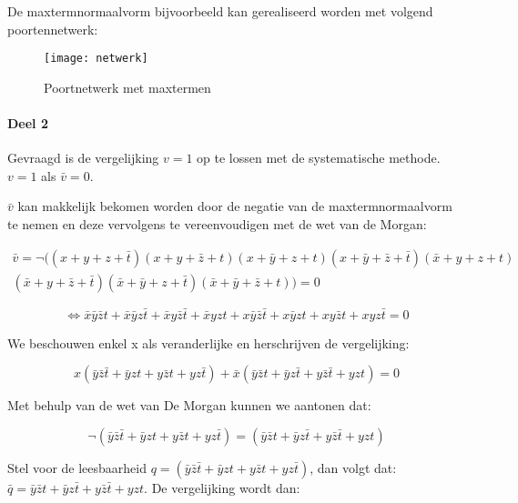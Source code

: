 \documentclass[12pt]{article}
\newcommand{\ov}[1]{\bar{#1}}
\begin{document}
De maxtermnormaalvorm bijvoorbeeld kan gerealiseerd worden met volgend poortennetwerk:


\begin{figure}[H]
\begin{center}
\texttt{[image: netwerk]}
\end{center}
\caption{Poortnetwerk met maxtermen}
\label{result11b}
\end{figure}

\paragraph{Deel 2}

Gevraagd is de vergelijking $v = 1$ op te lossen met de systematische methode. $v = 1$ als $\ov{v} = 0$.

$\ov{v}$ kan makkelijk bekomen worden door de negatie van de maxtermnormaalvorm te nemen en deze vervolgens te vereenvoudigen met de wet van de Morgan:

\begin{align}
\ov{v} = \neg ((x+y+z+\ov{t}) (x+y+\ov{z}+t) (x+\ov{y}+z+t) (x+\ov{y}+\ov{z}+\ov{t}) (\ov{x}+y+z+t) \nonumber \\ (\ov{x}+y+\ov{z}+\ov{t}) (\ov{x}+\ov{y}+z+\ov{t}) (\ov{x}+\ov{y}+\ov{z}+t)) = 0
\end{align}

\begin{equation}
\Leftrightarrow \ov{x}\ov{y}\ov{z}t + \ov{x}\ov{y}z\ov{t} + \ov{x}y\ov{z}\ov{t} + \ov{x}yzt + x\ov{y}\ov{z}\ov{t} + x\ov{y}zt + xy\ov{z}t + xyz\ov{t} = 0
\end{equation}

We beschouwen enkel x als veranderlijke en herschrijven de vergelijking:

\begin{equation}
x(\ov{y}\ov{z}\ov{t} + \ov{y}zt + y\ov{z}t + yz\ov{t}) + \ov{x}(\ov{y}\ov{z}t + \ov{y}z\ov{t} + y\ov{z}\ov{t} + yzt) = 0
\end{equation}

Met behulp van de wet van De Morgan kunnen we aantonen dat:

\begin{equation}
\neg (\ov{y}\ov{z}\ov{t} + \ov{y}zt + y\ov{z}t + yz\ov{t}) = (\ov{y}\ov{z}t + \ov{y}z\ov{t} + y\ov{z}\ov{t} + yzt)
\end{equation}

Stel voor de leesbaarheid $q = (\ov{y}\ov{z}\ov{t} + \ov{y}zt + y\ov{z}t + yz\ov{t})$, dan volgt dat: 
$\ov{q} = \ov{y}\ov{z}t + \ov{y}z\ov{t} + y\ov{z}\ov{t} + yzt$.
De vergelijking wordt dan:
\end{document}
